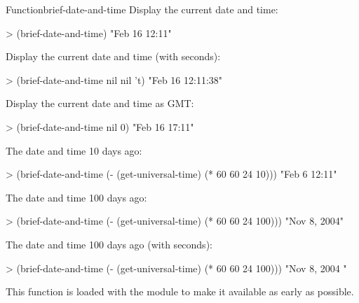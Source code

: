 \documentclass[10pt,twoside,english,pdftex]{article}
\begin{document}
\begin{functiondoc}{Function}{brief-date-and-time}{
    \returns{} }
\fnexamples
Display the current date and time: 
\begin{example}
> (brief-date-and-time)
"Feb 16 12:11"
\end{example}
Display the current date and time (with seconds):
\begin{example}
> (brief-date-and-time nil nil 't)
"Feb 16 12:11:38"
\end{example}
Display the current date and time as GMT: 
\begin{example}
> (brief-date-and-time nil 0)
"Feb 16 17:11"
\end{example}
The date and time 10 days ago:
\begin{example}
> (brief-date-and-time (- (get-universal-time) (* 60 60 24 10)))
"Feb 6 12:11"
\end{example}
The date and time 100 days ago:
\begin{example}
> (brief-date-and-time (- (get-universal-time) (* 60 60 24 100)))
"Nov  8, 2004"
\end{example}
The date and time 100 days ago (with seconds):
\begin{example}
> (brief-date-and-time (- (get-universal-time) (* 60 60 24 100)))
"Nov  8, 2004   "
\end{example}

\fnnote
{}%
%
This function is loaded with the  module to make it
available as early as possible.

\end{functiondoc}

\end{document}
